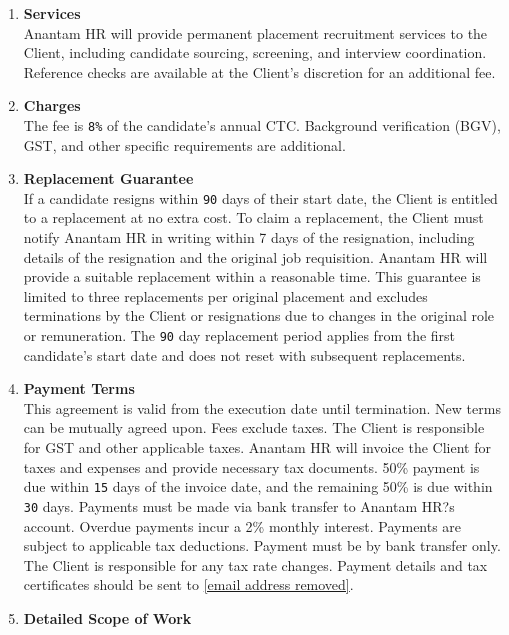 \documentclass{article}
\begin{document}
\begin{enumerate}[label=\arabic{enumi}.]
    \item \textbf{Services}\\
        Anantam HR will provide permanent placement recruitment services to the Client, including candidate sourcing, screening, and interview coordination. Reference checks are available at the Client's discretion for an additional fee.
    \item \textbf{Charges}\\
        The fee is \texttt{8\%} of the candidate's annual CTC. Background verification (BGV), GST, and other specific requirements are additional.
    \item \textbf{Replacement Guarantee}\\
        If a candidate resigns within \texttt{90} days of their start date, the Client is entitled to a replacement at no extra cost. To claim a replacement, the Client must notify Anantam HR in writing within 7 days of the resignation, including details of the resignation and the original job requisition. Anantam HR will provide a suitable replacement within a reasonable time. This guarantee is limited to three replacements per original placement and excludes terminations by the Client or resignations due to changes in the original role or remuneration. The \texttt{90} day replacement period applies from the first candidate's start date and does not reset with subsequent replacements.
    \item \textbf{Payment Terms}\\
        This agreement is valid from the execution date until termination. New terms can be mutually agreed upon. Fees exclude taxes. The Client is responsible for GST and other applicable taxes. Anantam HR will invoice the Client for taxes and expenses and provide necessary tax documents. 50\% payment is due within \texttt{15} days of the invoice date, and the remaining 50\% is due within \texttt{30} days. Payments must be made via bank transfer to Anantam HR?s account. Overdue payments incur a 2\% monthly interest. Payments are subject to applicable tax deductions. Payment must be by bank transfer only. The Client is responsible for any tax rate changes. Payment details and tax certificates should be sent to \href{mailto:[email address removed]}{[email address removed]}.
    \item \textbf{Detailed Scope of Work}\\

\end{enumerate}
\end{document}
